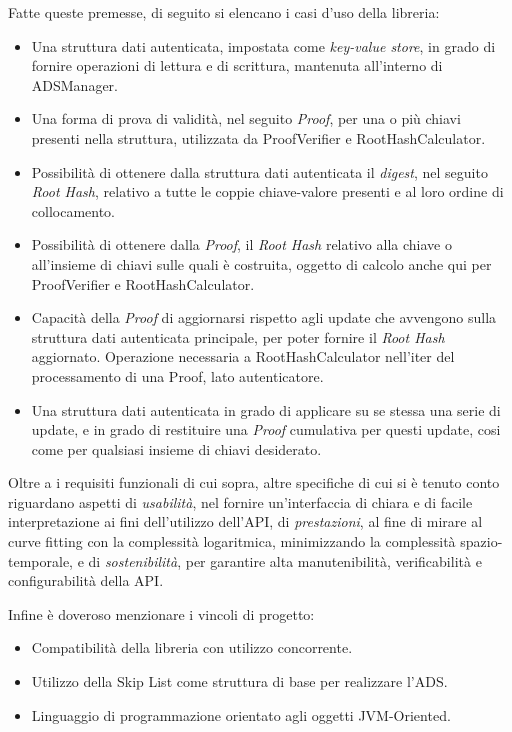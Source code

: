	Fatte queste premesse, di seguito si elencano i casi d'uso della libreria:
	
	\begin{itemize}
		\item Una struttura dati autenticata, impostata come \textit{key-value store}, in grado di fornire operazioni di lettura e di scrittura, mantenuta all'interno di ADSManager.
		\item Una forma di prova di validità, nel seguito \textit{Proof}, per una o più chiavi presenti nella struttura, utilizzata da ProofVerifier e RootHashCalculator.
		\item Possibilità di ottenere dalla struttura dati autenticata il \textit{digest}, nel seguito \textit{Root Hash}, relativo a tutte le coppie chiave-valore presenti e al loro ordine di collocamento.
		\item Possibilità di ottenere dalla \textit{Proof}, il \textit{Root Hash} relativo alla chiave o all'insieme di chiavi sulle quali è costruita, oggetto di calcolo anche qui per ProofVerifier e RootHashCalculator.
		\item Capacità della \textit{Proof} di aggiornarsi rispetto agli update che avvengono sulla struttura dati autenticata principale, per poter fornire il \textit{Root Hash} aggiornato. Operazione necessaria a RootHashCalculator nell'iter del processamento di una Proof, lato autenticatore.
 		\item Una struttura dati autenticata in grado di applicare su se stessa una serie di update, e in grado di restituire una \textit{Proof} cumulativa per questi update, cosi come per qualsiasi insieme di chiavi desiderato.
	\end{itemize}
	
	Oltre a i requisiti funzionali di cui sopra, altre specifiche di cui si è tenuto conto riguardano aspetti di \textit{usabilità}, nel fornire un'interfaccia di chiara e di facile interpretazione ai fini dell'utilizzo dell'API, di \textit{prestazioni}, al fine di mirare al curve fitting con la complessità logaritmica, minimizzando la complessità spazio-temporale, e di \textit{sostenibilità}, per garantire alta manutenibilità, verificabilità e configurabilità della API.
	
	Infine è doveroso menzionare i vincoli di progetto:
	\begin{itemize}
		\item Compatibilità della libreria con utilizzo concorrente.
		\item Utilizzo della Skip List come struttura di base per realizzare l'ADS.
		\item Linguaggio di programmazione orientato agli oggetti JVM-Oriented.
	\end{itemize}

